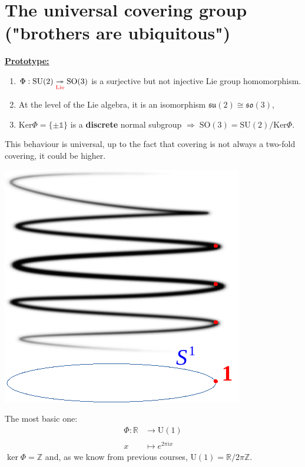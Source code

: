 \documentclass[../main.tex]{subfiles}
\begin{document}
\section[The universal covering group ("brothers are ubiquitous")]{The universal covering group\\ ("brothers are ubiquitous")}
\underline{\textbf{Prototype:}}
\begin{enumerate}
    \item $\Phi:\textrm{SU}(2)\underset{{\color{red}\textrm{Lie}}}{\twoheadrightarrow}\textrm{SO}(3)$ is a surjective but not injective Lie group homomorphism. 
    \item At the level of the Lie algebra, it is an isomorphism $\mathfrak{su}(2)\cong\mathfrak{so}(3)$,
    \item Ker$\Phi=\{\pm\mathbb{1}\}$ is a \textbf{discrete} normal subgroup $\Rightarrow\;\textrm{SO}(3)=\textrm{SU}(2)\big/\textrm{Ker}\Phi$.
    \end{enumerate}
This behaviour is universal, up to the fact that covering is not always a two-fold covering, it could be higher.
\begin{marginfigure}
    \includegraphics[]{images/spiral.pdf}
    \caption*{}
\end{marginfigure} 
\begin{example}
The most basic one:
\begin{align*}
    \Phi:\mathbb{R}&\xrightarrow[]{}\text{U}(1)\\
    x&\mapsto e^{2\pi ix}
\end{align*}
$\ker\Phi=\mathbb{Z}$ and, as we know from previous courses, $\textrm{U}(1)=\mathbb{R}/2\pi\mathbb{Z}$.
\end{example}
\end{document}
